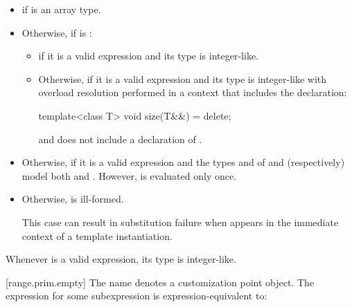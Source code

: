 \begin{itemize}
\item
   if  is an array
  type.

\item
  Otherwise, if
  is :
  \begin{itemize}
  \item
    if it is a valid expression and its type 
    is integer-like.

  \item
    Otherwise, 
    if it is a valid expression and its type 
    is integer-like
    with overload resolution performed in a context that includes
    the declaration:
    \begin{codeblock}
    template<class T> void size(T&&) = delete;
    \end{codeblock}

    and does not include a declaration of .
  \end{itemize}

\item
  Otherwise, 
  if it is a valid expression and
  the types  and  of  and
   (respectively) model both
   and
  .
  However,  is evaluated only once.

\item
  Otherwise,  is ill-formed.
  \begin{note}
  This case can result in substitution failure when 
  appears in the immediate context of a template instantiation.
  \end{note}
\end{itemize}

\pnum
\begin{note}
Whenever  is a valid expression, its
type is integer-like.
\end{note}

[range.prim.empty]{}
\pnum
The name  denotes a customization point
object. The expression
 for some subexpression  is
expression-equivalent to:

